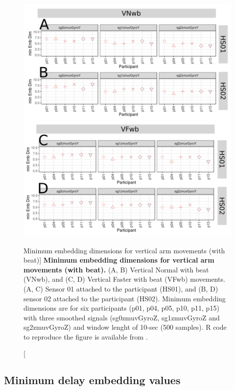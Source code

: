 \begin{figure}
\centering
\includegraphics[width=1.0\textwidth]{cao_Vwb_w10}
	\caption
	[Minimum embedding dimensions for vertical arm movements 
	(with beat)]{
	{\bf Minimum embedding dimensions for vertical arm movements 
	(with beat).} 
		(A, B) Vertical Normal with beat (VNwb), and
		(C, D) Vertical Faster with beat (VFwb) movements.
		(A, C) Sensor 01 attached to the participant (HS01), and
		(B, D) sensor 02 attached to the participant (HS02).
		Minimum embedding dimensions are for six participants 
		(p01, p04, p05, p10, p11, p15) with three smoothed signals 
		(sg0zmuvGyroZ, sg1zmuvGyroZ and sg2zmuvGyroZ)
		and window lenght of 10-sec (500 samples).
		R code to reproduce the figure is available 
		from \cite{hwum2018}.
        }
    \label{fig:caoVwb}
\end{figure}






\newpage
\subsection{Minimum delay embedding values}

